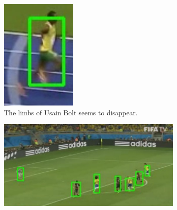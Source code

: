 \begin{figure}[!h]
\begin{subfigure}[!h]{0.19\textwidth}
		\includegraphics[width=\linewidth]{images/tracking/challenge_blurred}
		\caption{The limbs of Usain Bolt seems to disappear.}
		\label{fig:challenge_blurred}
	\end{subfigure}
	\begin{subfigure}[!h]{0.49\textwidth}
		\includegraphics[width=\linewidth]{images/tracking/challenge_multiple}

\end{subfigure}
\end{figure}
